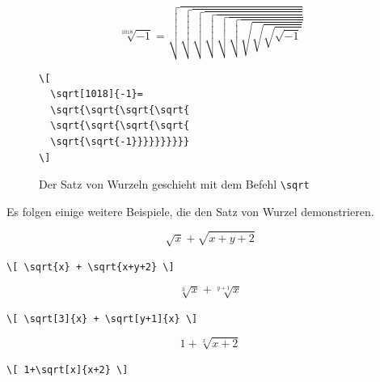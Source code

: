 \documentclass[a4paper,10pt,twoside]{scrbook}
\begin{document}
{\begin{figure}[H]
\begin{minipage}[c]{.5\textwidth}
\setlength{\parskip}{1em}

\[
  \sqrt[1018]{-1}=
  \sqrt{\sqrt{\sqrt{\sqrt{
  \sqrt{\sqrt{\sqrt{\sqrt{
  \sqrt{\sqrt{-1}}}}}}}}}}
\]

\end{minipage}
\hfill
\begin{minipage}{.48\textwidth}
\setlength{\parskip}{1em}
\begin{lstlisting}[label=sqrtbeispiel, style=customlatex]
\[
  \sqrt[1018]{-1}=
  \sqrt{\sqrt{\sqrt{\sqrt{
  \sqrt{\sqrt{\sqrt{\sqrt{
  \sqrt{\sqrt{-1}}}}}}}}}}
\]
\end{lstlisting}
\end{minipage}
\caption{Der Satz von Wurzeln geschieht mit dem Befehl \texttt{\textbackslash sqrt}}
\label{Beispiel_sqrt1}
\end{figure}

Es folgen einige weitere Beispiele, die den Satz von Wurzel demonstrieren.

\begin{minipage}[c]{.4\textwidth}
\vspace*{-5mm}
\[ \sqrt{x} + \sqrt{x+y+2} \] 
\end{minipage}
\hfill
\begin{minipage}[c]{.58\textwidth}
\setlength{\parskip}{1em}
\verb!\[ \sqrt{x} + \sqrt{x+y+2} \] !
\end{minipage}

\begin{minipage}[c]{.4\textwidth}
\vspace*{-5mm}
\[ \sqrt[3]{x} + \sqrt[y+1]{x} \]
\end{minipage}
\hfill
\begin{minipage}[c]{.58\textwidth}
\setlength{\parskip}{1em}
\verb!\[ \sqrt[3]{x} + \sqrt[y+1]{x} \] !
\end{minipage}

\begin{minipage}[c]{.4\textwidth}
\vspace*{-5mm}
\[ 1+\sqrt[x]{x+2} \]
\end{minipage}
\hfill
\begin{minipage}[c]{.58\textwidth}
\setlength{\parskip}{1em}
\verb!\[ 1+\sqrt[x]{x+2} \] !
\end{minipage}

}
\end{document}
